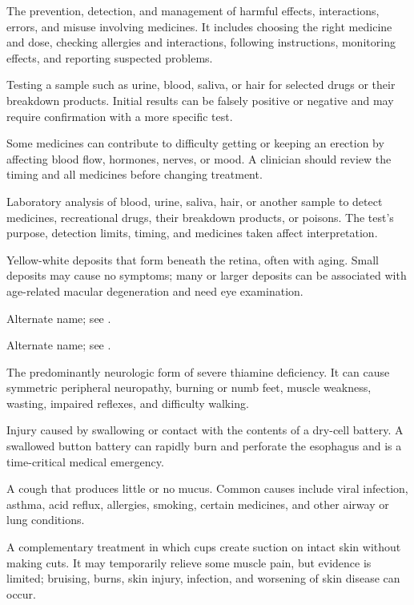  The prevention, detection, and management of harmful effects, interactions, errors, and misuse involving medicines. It includes choosing the right medicine and dose, checking allergies and interactions, following instructions, monitoring effects, and reporting suspected problems.

 Testing a sample such as urine, blood, saliva, or hair for selected drugs or their breakdown products. Initial results can be falsely positive or negative and may require confirmation with a more specific test.

 Some medicines can contribute to difficulty getting or keeping an erection by affecting blood flow, hormones, nerves, or mood. A clinician should review the timing and all medicines before changing treatment.

 Laboratory analysis of blood, urine, saliva, hair, or another sample to detect medicines, recreational drugs, their breakdown products, or poisons. The test’s purpose, detection limits, timing, and medicines taken affect interpretation.

 Yellow-white deposits that form beneath the retina, often with aging. Small deposits may cause no symptoms; many or larger deposits can be associated with age-related macular degeneration and need eye examination.

 Alternate name; see .

 Alternate name; see .

 The predominantly neurologic form of severe thiamine deficiency. It can cause symmetric peripheral neuropathy, burning or numb feet, muscle weakness, wasting, impaired reflexes, and difficulty walking.

 Injury caused by swallowing or contact with the contents of a dry-cell battery. A swallowed button battery can rapidly burn and perforate the esophagus and is a time-critical medical emergency.

 A cough that produces little or no mucus. Common causes include viral infection, asthma, acid reflux, allergies, smoking, certain medicines, and other airway or lung conditions.

 A complementary treatment in which cups create suction on intact skin without making cuts. It may temporarily relieve some muscle pain, but evidence is limited; bruising, burns, skin injury, infection, and worsening of skin disease can occur.

